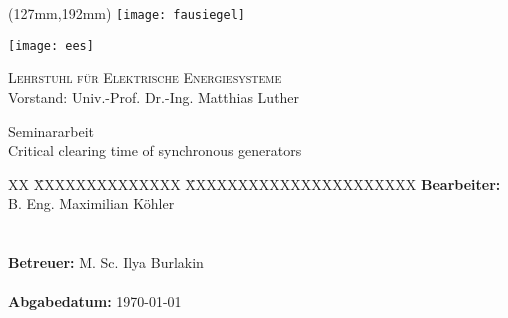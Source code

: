 \begin{titlepage}
	\thispagestyle{empty}
	\setcounter{page}{-1}
	
	
	\begin{textblock*}{\textwidth}(127mm,192mm)
	\texttt{[image: fausiegel]}
	\end{textblock*}
	

	\begin{minipage}[]{47mm}
		\texttt{[image: ees]}
	\end{minipage}
	\begin{minipage}[]{.7\textwidth}
		\raggedleft
		\textsc{Lehrstuhl für Elektrische Energiesysteme}\\
		Vorstand: Univ.-Prof. Dr.-Ing. Matthias Luther
	\end{minipage}
	
	\vspace{51mm}
	
	{\centering
	
	\large{Seminararbeit} \\	
	\Large{Critical clearing time of synchronous generators}
	
	\par}
	
	\vspace{105mm}
	
	{\raggedright
	\begin{tabbing}
	XX \= XXXXXXXXXXXXXX \= XXXXXXXXXXXXXXXXXXXXXX \kill
			\> \textbf{Bearbeiter:} 	\> B. Eng. Maximilian Köhler \\
			\>						\> 23176975		\\
	 		\>												\>									\\
			\> \textbf{Betreuer:}		\> M. Sc. Ilya Burlakin \\
			\>												\>									\\
			\> \textbf{Abgabedatum:}	\> \today															
	\end{tabbing}
	\par}
\end{titlepage}
